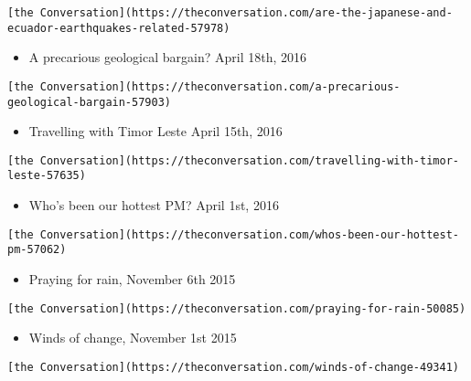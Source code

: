 \documentclass[
]{article}
\providecommand{\tightlist}{%
  \setlength{\itemsep}{0pt}\setlength{\parskip}{0pt}}
\begin{document}
\begin{verbatim}
[the Conversation](https://theconversation.com/are-the-japanese-and-ecuador-earthquakes-related-57978)
\end{verbatim}

\begin{itemize}
\tightlist
\item
  A precarious geological bargain? April 18th, 2016
\end{itemize}

\begin{verbatim}
[the Conversation](https://theconversation.com/a-precarious-geological-bargain-57903)
\end{verbatim}

\begin{itemize}
\tightlist
\item
  Travelling with Timor Leste April 15th, 2016
\end{itemize}

\begin{verbatim}
[the Conversation](https://theconversation.com/travelling-with-timor-leste-57635)
\end{verbatim}

\begin{itemize}
\tightlist
\item
  Who's been our hottest PM? April 1st, 2016
\end{itemize}

\begin{verbatim}
[the Conversation](https://theconversation.com/whos-been-our-hottest-pm-57062)
\end{verbatim}

\begin{itemize}
\tightlist
\item
  Praying for rain, November 6th 2015
\end{itemize}

\begin{verbatim}
[the Conversation](https://theconversation.com/praying-for-rain-50085)
\end{verbatim}

\begin{itemize}
\tightlist
\item
  Winds of change, November 1st 2015
\end{itemize}

\begin{verbatim}
[the Conversation](https://theconversation.com/winds-of-change-49341)
\end{verbatim}
\end{document}
